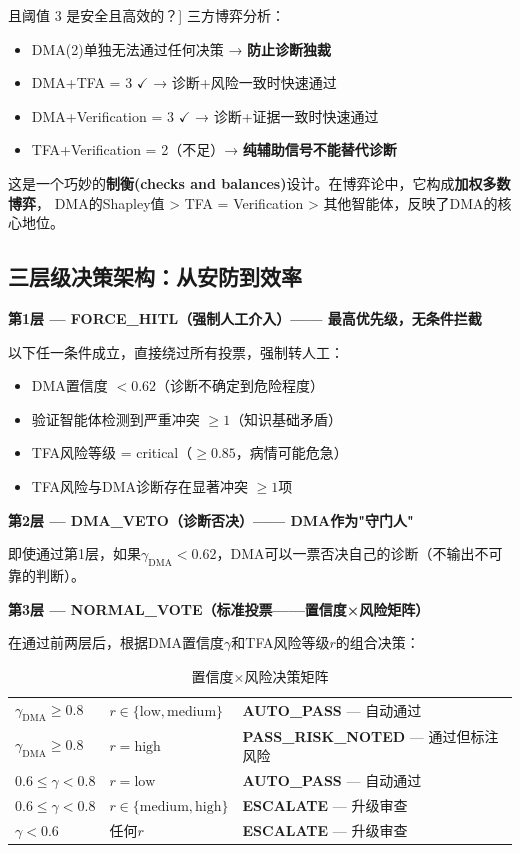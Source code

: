 \documentclass[11pt,a4paper]{ctexart}
\begin{document}
\begin{keybox}[为什么 [2,1,1] 且阈值 3 是安全且高效的？]
三方博弈分析：
\begin{itemize}[nosep]
\item DMA(2)单独无法通过任何决策 → \textbf{防止诊断独裁}
\item DMA+TFA = 3 $\checkmark$ → 诊断+风险一致时快速通过
\item DMA+Verification = 3 $\checkmark$ → 诊断+证据一致时快速通过
\item TFA+Verification = 2（不足）→ \textbf{纯辅助信号不能替代诊断}
\end{itemize}
这是一个巧妙的\textbf{制衡(checks and balances)}设计。在博弈论中，它构成\textbf{加权多数博弈}，
DMA的Shapley值 > TFA = Verification > 其他智能体，反映了DMA的核心地位。
\end{keybox}

\subsection{三层级决策架构：从安防到效率}

\textbf{第1层 — FORCE\_HITL（强制人工介入）—— 最高优先级，无条件拦截}

以下任一条件成立，直接绕过所有投票，强制转人工：
\begin{itemize}[nosep]
\item DMA置信度 $< 0.62$（诊断不确定到危险程度）
\item 验证智能体检测到严重冲突 $\geq 1$（知识基础矛盾）
\item TFA风险等级 = critical（$\geq 0.85$，病情可能危急）
\item TFA风险与DMA诊断存在显著冲突 $\geq 1$项
\end{itemize}

\textbf{第2层 — DMA\_VETO（诊断否决）—— DMA作为"守门人"}

即使通过第1层，如果$\gamma_{\text{DMA}} < 0.62$，DMA可以一票否决自己的诊断（不输出不可靠的判断）。

\textbf{第3层 — NORMAL\_VOTE（标准投票——置信度×风险矩阵）}

在通过前两层后，根据DMA置信度$\gamma$和TFA风险等级$r$的组合决策：

\begin{table}[H]
\centering
\small
\begin{tabular}{lll}
\toprule
$\gamma_{\text{DMA}} \geq 0.8$ & $r \in \{\text{low}, \text{medium}\}$ & \textbf{AUTO\_PASS} — 自动通过 \\
$\gamma_{\text{DMA}} \geq 0.8$ & $r = \text{high}$ & \textbf{PASS\_RISK\_NOTED} — 通过但标注风险 \\
$0.6 \leq \gamma < 0.8$ & $r = \text{low}$ & \textbf{AUTO\_PASS} — 自动通过 \\
$0.6 \leq \gamma < 0.8$ & $r \in \{\text{medium}, \text{high}\}$ & \textbf{ESCALATE} — 升级审查 \\
$\gamma < 0.6$ & 任何$r$ & \textbf{ESCALATE} — 升级审查 \\
\bottomrule
\end{tabular}
\caption{置信度×风险决策矩阵}
\end{table}
\end{document}
